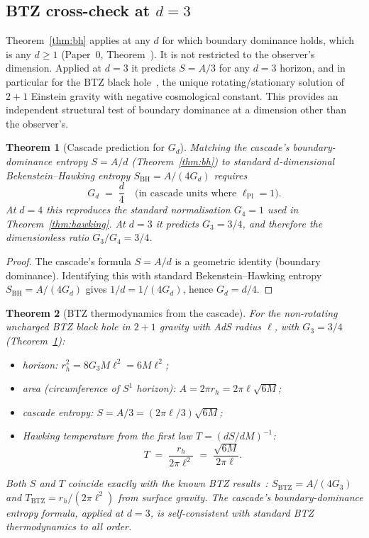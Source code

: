 \documentclass[12pt,a4paper]{article}
\newtheorem{theorem}{Theorem}[section]
\begin{document}
\subsection{BTZ cross-check at \texorpdfstring{$d=3$}{d=3}}
\label{subsec:btz}

Theorem~\ref{thm:bh} applies at any $d$ for which boundary dominance holds,
which is any $d\geq 1$ (Paper~0, Theorem~). It is not restricted to the
observer's dimension. Applied at $d=3$ it predicts
$S = A/3$ for any $d=3$ horizon, and in particular for the BTZ black
hole~\cite{btz}, the unique rotating/stationary solution of $2+1$
Einstein gravity with negative cosmological constant. This provides an
independent structural test of boundary dominance at a dimension other
than the observer's.

\begin{theorem}[Cascade prediction for $G_d$]\label{thm:Gd}
Matching the cascade's boundary-dominance entropy $S = A/d$
(Theorem~\ref{thm:bh}) to standard $d$-dimensional Bekenstein--Hawking
entropy $S_{\mathrm{BH}} = A/(4 G_d)$ requires
\[
G_d \;=\; \frac{d}{4} \quad\text{(in cascade units where $\ell_{\mathrm{Pl}}=1$).}
\]
At $d=4$ this reproduces the standard normalisation $G_4 = 1$ used in
Theorem~\ref{thm:hawking}. At $d=3$ it predicts $G_3 = 3/4$, and therefore
the dimensionless ratio $G_3/G_4 = 3/4$.
\end{theorem}

\begin{proof}
The cascade's formula $S = A/d$ is a geometric identity
(boundary dominance). Identifying this with standard Bekenstein--Hawking
entropy $S_{\mathrm{BH}} = A/(4G_d)$ gives $1/d = 1/(4G_d)$, hence
$G_d = d/4$.
\end{proof}

\begin{theorem}[BTZ thermodynamics from the cascade]\label{thm:btz}
For the non-rotating uncharged BTZ black hole in $2+1$ gravity with AdS
radius $\ell$, with $G_3 = 3/4$ (Theorem~\ref{thm:Gd}):
\begin{itemize}[nosep]
\item horizon: $r_h^2 = 8 G_3 M \ell^2 = 6 M \ell^2$;
\item area (circumference of $S^1$ horizon): $A = 2\pi r_h = 2\pi\ell\sqrt{6M}$;
\item cascade entropy: $S = A/3 = (2\pi\ell/3)\sqrt{6M}$;
\item Hawking temperature from the first law $T = (dS/dM)^{-1}$:
\[
T \;=\; \frac{r_h}{2\pi\ell^2} \;=\; \frac{\sqrt{6M}}{2\pi\ell}.
\]
\end{itemize}
Both $S$ and $T$ coincide exactly with the known BTZ
results~\cite{btz,carlip-btz}: $S_{\mathrm{BTZ}} = A/(4G_3)$ and
$T_{\mathrm{BTZ}} = r_h/(2\pi\ell^2)$ from surface gravity. The cascade's
boundary-dominance entropy formula, applied at $d=3$, is self-consistent
with standard BTZ thermodynamics to all order.
\end{theorem}
\end{document}
